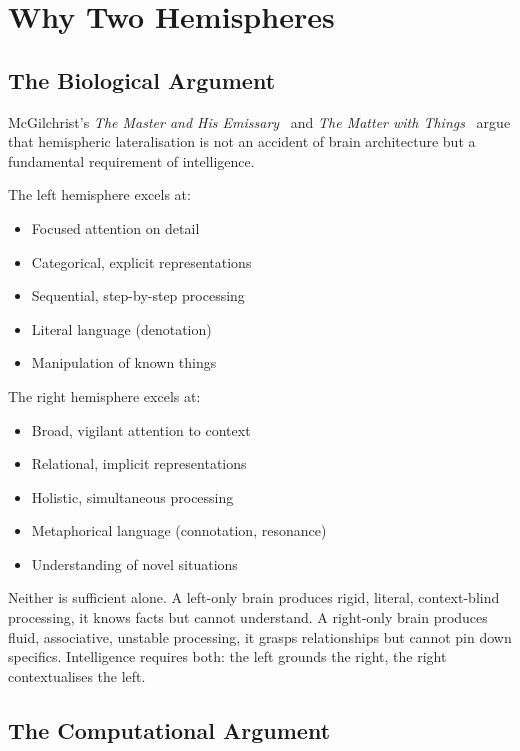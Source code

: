 \documentclass[11pt, a4paper]{article}
\theoremstyle{plain}
\theoremstyle{definition}
\theoremstyle{remark}
\begin{document}
\section{Why Two Hemispheres}

\subsection{The Biological Argument}

McGilchrist's \emph{The Master and His Emissary}~\cite{mcgilchrist2009master} and \emph{The Matter with Things}~\cite{mcgilchrist2021matter} argue that hemispheric lateralisation is not an accident of brain architecture but a fundamental requirement of intelligence.

The left hemisphere excels at:
\begin{itemize}[nosep]
\item Focused attention on detail
\item Categorical, explicit representations
\item Sequential, step-by-step processing
\item Literal language (denotation)
\item Manipulation of known things
\end{itemize}

The right hemisphere excels at:
\begin{itemize}[nosep]
\item Broad, vigilant attention to context
\item Relational, implicit representations
\item Holistic, simultaneous processing
\item Metaphorical language (connotation, resonance)
\item Understanding of novel situations
\end{itemize}

Neither is sufficient alone.
A left-only brain produces rigid, literal, context-blind processing, it knows facts but cannot understand.
A right-only brain produces fluid, associative, unstable processing, it grasps relationships but cannot pin down specifics.
Intelligence requires both: the left grounds the right, the right contextualises the left.

\subsection{The Computational Argument}
\end{document}
